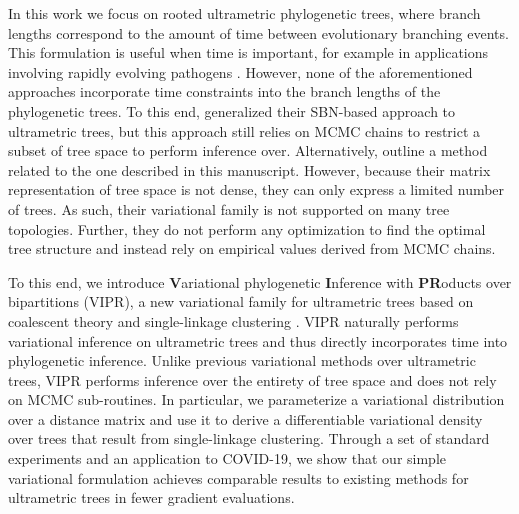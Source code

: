 In this work we focus on rooted ultrametric phylogenetic trees, where branch lengths correspond to the amount of time between evolutionary branching events. This formulation is useful when time is important, for example in applications involving rapidly evolving pathogens \citep{Sagulenko:2018}. However, none of the aforementioned approaches incorporate time constraints into the branch lengths of the phylogenetic trees. To this end, \citet{Zhang:2024} generalized their SBN-based approach to ultrametric trees, but this approach still relies on MCMC chains to restrict a subset of tree space to perform inference over. Alternatively, \citet{Bouckaert:2024} outline a method related to the one described in this manuscript. However, because their matrix representation of tree space is not dense, they can only express a limited number of trees. As such, their variational family is not supported on many tree topologies. Further, they do not perform any optimization to find the optimal tree structure and instead rely on empirical values derived from MCMC chains.

To this end, we introduce \textbf{V}ariational phylogenetic \textbf{I}nference with \textbf{PR}oducts over bipartitions (VIPR), a new variational family for ultrametric trees based on coalescent theory and single-linkage clustering \citep{Kingman:1982}. VIPR naturally performs variational inference on ultrametric trees and thus directly incorporates time into phylogenetic inference. Unlike previous variational methods over ultrametric trees, VIPR performs inference over the entirety of tree space and does not rely on MCMC sub-routines. In particular, we parameterize a variational distribution over a distance matrix and use it to derive a differentiable variational density over trees that result from single-linkage clustering. Through a set of standard experiments and an application to COVID-19, we show that our simple variational formulation achieves comparable results to existing methods for ultrametric trees in fewer gradient evaluations.